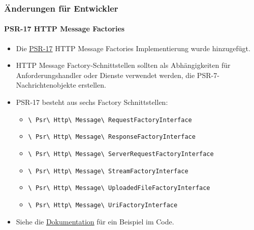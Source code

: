 
\begin{frame}[fragile]
	\frametitle{Änderungen für Entwickler}
	\framesubtitle{PSR-17 HTTP Message Factories}

	\begin{itemize}
		\item Die \href{https://www.php-fig.org/psr/psr-17/}{PSR-17}
			HTTP Message Factories Implementierung wurde hinzugefügt.
		\item HTTP Message Factory-Schnittstellen sollten als Abhängigkeiten für 
			Anforderungshandler oder Dienste verwendet werden, die PSR-7-Nachrichtenobjekte erstellen.
		\item PSR-17 besteht aus sechs Factory Schnittstellen:

			\begin{itemize}\smaller
				\item \texttt{\textbackslash
					Psr\textbackslash
					Http\textbackslash
					Message\textbackslash
					RequestFactoryInterface}
				\item \texttt{\textbackslash
					Psr\textbackslash
					Http\textbackslash
					Message\textbackslash
					ResponseFactoryInterface}
				\item \texttt{\textbackslash
					Psr\textbackslash
					Http\textbackslash
					Message\textbackslash
					ServerRequestFactoryInterface}
				\item \texttt{\textbackslash
					Psr\textbackslash
					Http\textbackslash
					Message\textbackslash
					StreamFactoryInterface}
				\item \texttt{\textbackslash
					Psr\textbackslash
					Http\textbackslash
					Message\textbackslash
					UploadedFileFactoryInterface}
				\item \texttt{\textbackslash
					Psr\textbackslash
					Http\textbackslash
					Message\textbackslash
					UriFactoryInterface}

			\end{itemize}\normalsize

		\item Siehe die
			\href{https://docs.typo3.org/c/typo3/cms-core/master/en-us/Changelog/10.1/Feature-89018-ProvideImplementationForPSR-17HTTPMessageFactories.html}{Dokumentation}
			für ein Beispiel im Code.

	\end{itemize}

\end{frame}

